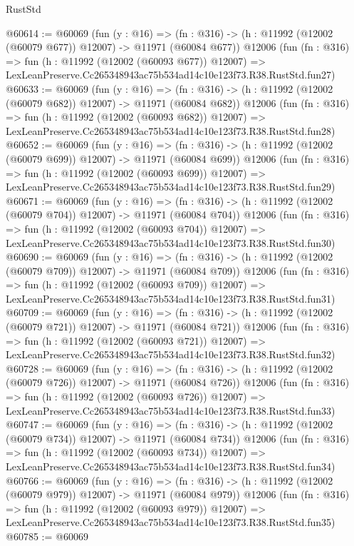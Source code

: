 \begin{lexlean}{RustStd}
\begin{coremodule}
@60614 := @60069
    (fun (y : @16) =>
    (fn : @316) -> (h : @11992 (@12002 (@60079 @677)) @12007) -> @11971 (@60084 @677))
    @12006
    (fun (fn : @316) =>
    fun (h : @11992 (@12002 (@60093 @677)) @12007) =>
    LexLeanPreserve.Cc265348943ac75b534ad14c10e123f73.R38.RustStd.fun27)
@60633 := @60069
    (fun (y : @16) =>
    (fn : @316) -> (h : @11992 (@12002 (@60079 @682)) @12007) -> @11971 (@60084 @682))
    @12006
    (fun (fn : @316) =>
    fun (h : @11992 (@12002 (@60093 @682)) @12007) =>
    LexLeanPreserve.Cc265348943ac75b534ad14c10e123f73.R38.RustStd.fun28)
@60652 := @60069
    (fun (y : @16) =>
    (fn : @316) -> (h : @11992 (@12002 (@60079 @699)) @12007) -> @11971 (@60084 @699))
    @12006
    (fun (fn : @316) =>
    fun (h : @11992 (@12002 (@60093 @699)) @12007) =>
    LexLeanPreserve.Cc265348943ac75b534ad14c10e123f73.R38.RustStd.fun29)
@60671 := @60069
    (fun (y : @16) =>
    (fn : @316) -> (h : @11992 (@12002 (@60079 @704)) @12007) -> @11971 (@60084 @704))
    @12006
    (fun (fn : @316) =>
    fun (h : @11992 (@12002 (@60093 @704)) @12007) =>
    LexLeanPreserve.Cc265348943ac75b534ad14c10e123f73.R38.RustStd.fun30)
@60690 := @60069
    (fun (y : @16) =>
    (fn : @316) -> (h : @11992 (@12002 (@60079 @709)) @12007) -> @11971 (@60084 @709))
    @12006
    (fun (fn : @316) =>
    fun (h : @11992 (@12002 (@60093 @709)) @12007) =>
    LexLeanPreserve.Cc265348943ac75b534ad14c10e123f73.R38.RustStd.fun31)
@60709 := @60069
    (fun (y : @16) =>
    (fn : @316) -> (h : @11992 (@12002 (@60079 @721)) @12007) -> @11971 (@60084 @721))
    @12006
    (fun (fn : @316) =>
    fun (h : @11992 (@12002 (@60093 @721)) @12007) =>
    LexLeanPreserve.Cc265348943ac75b534ad14c10e123f73.R38.RustStd.fun32)
@60728 := @60069
    (fun (y : @16) =>
    (fn : @316) -> (h : @11992 (@12002 (@60079 @726)) @12007) -> @11971 (@60084 @726))
    @12006
    (fun (fn : @316) =>
    fun (h : @11992 (@12002 (@60093 @726)) @12007) =>
    LexLeanPreserve.Cc265348943ac75b534ad14c10e123f73.R38.RustStd.fun33)
@60747 := @60069
    (fun (y : @16) =>
    (fn : @316) -> (h : @11992 (@12002 (@60079 @734)) @12007) -> @11971 (@60084 @734))
    @12006
    (fun (fn : @316) =>
    fun (h : @11992 (@12002 (@60093 @734)) @12007) =>
    LexLeanPreserve.Cc265348943ac75b534ad14c10e123f73.R38.RustStd.fun34)
@60766 := @60069
    (fun (y : @16) =>
    (fn : @316) -> (h : @11992 (@12002 (@60079 @979)) @12007) -> @11971 (@60084 @979))
    @12006
    (fun (fn : @316) =>
    fun (h : @11992 (@12002 (@60093 @979)) @12007) =>
    LexLeanPreserve.Cc265348943ac75b534ad14c10e123f73.R38.RustStd.fun35)
@60785 := @60069

\end{coremodule}
\end{lexlean}
